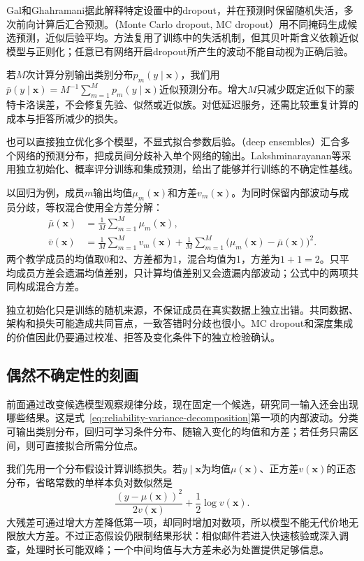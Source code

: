 Gal和Ghahramani据此解释特定设置中的dropout，并在预测时保留随机失活，多次前向计算后汇合预测。（Monte Carlo dropout, MC dropout）用不同掩码生成候选预测，近似后验平均。方法复用了训练中的失活机制，但其贝叶斯含义依赖近似模型与正则化；任意已有网络开启dropout所产生的波动不能自动视为正确后验。

若$M$次计算分别输出类别分布$p_m(y\mid\bm{x})$，我们用$\bar p(y\mid\bm{x})=M^{-1}\sum_{m=1}^{M}p_m(y\mid\bm{x})$近似预测分布。增大$M$只减少既定近似下的蒙特卡洛误差，不会修复先验、似然或近似族。对低延迟服务，还需比较重复计算的成本与拒答所减少的损失。

也可以直接独立优化多个模型，不显式拟合参数后验。（deep ensembles）汇合多个网络的预测分布，把成员间分歧补入单个网络的输出。Lakshminarayanan等采用独立初始化、概率评分训练和集成预测，给出了能够并行训练的不确定性基线。

以回归为例，成员$m$输出均值$\mu_m(\bm{x})$和方差$v_m(\bm{x})$。为同时保留内部波动与成员分歧，等权混合使用全方差分解：
\begin{equation}
 \begin{aligned}
 \bar\mu(\bm{x})&=\frac1M\sum_{m=1}^{M}\mu_m(\bm{x}),\\
 \bar v(\bm{x})&=\frac1M\sum_{m=1}^{M}v_m(\bm{x})
  +\frac1M\sum_{m=1}^{M}
       \bigl(\mu_m(\bm{x})-\bar\mu(\bm{x})\bigr)^2.
 \end{aligned}
 \label{eq:reliability-ensemble-variance}
\end{equation}
两个教学成员的均值取0和2、方差都为1，混合均值为1，方差为$1+1=2$。只平均成员方差会遗漏均值差别，只计算均值差别又会遗漏内部波动；公式中的两项共同构成混合方差。

独立初始化只是训练的随机来源，不保证成员在真实数据上独立出错。共同数据、架构和损失可能造成共同盲点，一致答错时分歧也很小。MC dropout和深度集成的价值因此仍要通过校准、拒答及变化条件下的独立检验确认。

\subsection{偶然不确定性的刻画}
\label{sec:reliability-aleatoric-estimation}

前面通过改变候选模型观察规律分歧，现在固定一个候选，研究同一输入还会出现哪些结果。这是式~\eqref{eq:reliability-variance-decomposition}第一项的内部波动。分类可输出类别分布，回归可学习条件分布、随输入变化的均值和方差；若任务只需区间，则可直接拟合所需分位点。

我们先用一个分布假设计算训练损失。若$y\mid\bm{x}$为均值$\mu(\bm{x})$、正方差$v(\bm{x})$的正态分布，省略常数的单样本负对数似然是
\[
 \frac{(y-\mu(\bm{x}))^2}{2v(\bm{x})}
       +\frac12\log v(\bm{x}).
\]
大残差可通过增大方差降低第一项，却同时增加对数项，所以模型不能无代价地无限放大方差。不过正态假设仍限制结果形状：相似邮件若进入快速核验或深入调查，处理时长可能双峰；一个中间均值与大方差未必为处置提供足够信息。

